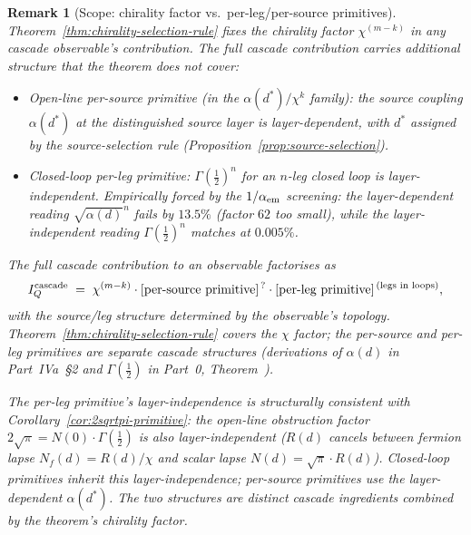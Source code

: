 \documentclass[12pt,a4paper]{article}
\newtheorem*{remark}{Remark}
\begin{document}
\begin{remark}[Scope: chirality factor vs.\ per-leg/per-source primitives]\label{rem:chirality-scope}
Theorem~\ref{thm:chirality-selection-rule} fixes the \emph{chirality factor} $\chi^{(m-k)}$ in any cascade observable's contribution. The full cascade contribution carries additional structure that the theorem does not cover:
\begin{itemize}[nosep]
\item \emph{Open-line per-source primitive} (in the $\alpha(d^*)/\chi^k$ family): the source coupling $\alpha(d^*)$ at the distinguished source layer is \emph{layer-dependent}, with $d^*$ assigned by the source-selection rule (Proposition~\ref{prop:source-selection}).
\item \emph{Closed-loop per-leg primitive}: $\Gamma(\tfrac{1}{2})^n$ for an $n$-leg closed loop is \emph{layer-independent}. Empirically forced by the $1/\alpha_{\rm em}$ screening: the layer-dependent reading $\sqrt{\alpha(d)}^n$ fails by $13.5\%$ (factor $62$ too small), while the layer-independent reading $\Gamma(\tfrac{1}{2})^n$ matches at $0.005\%$.
\end{itemize}
The full cascade contribution to an observable factorises as
\[
I_Q^{\rm cascade} \;=\; \chi^{(m-k)} \cdot [\text{per-source primitive}]^{\,?} \cdot [\text{per-leg primitive}]^{\,(\text{legs in loops})},
\]
with the source/leg structure determined by the observable's topology. Theorem~\ref{thm:chirality-selection-rule} covers the $\chi$ factor; the per-source and per-leg primitives are separate cascade structures (derivations of $\alpha(d)$ in Part~IVa~\S2 and $\Gamma(\tfrac{1}{2})$ in Part~0, Theorem~).

The per-leg primitive's layer-independence is structurally consistent with Corollary~\ref{cor:2sqrtpi-primitive}: the open-line obstruction factor $2\sqrt{\pi} = N(0)\cdot\Gamma(\tfrac{1}{2})$ is also layer-independent ($R(d)$ cancels between fermion lapse $N_f(d) = R(d)/\chi$ and scalar lapse $N(d) = \sqrt{\pi}\cdot R(d)$). Closed-loop primitives inherit this layer-independence; per-source primitives use the layer-dependent $\alpha(d^*)$. The two structures are distinct cascade ingredients combined by the theorem's chirality factor.
\end{remark}
\end{document}

